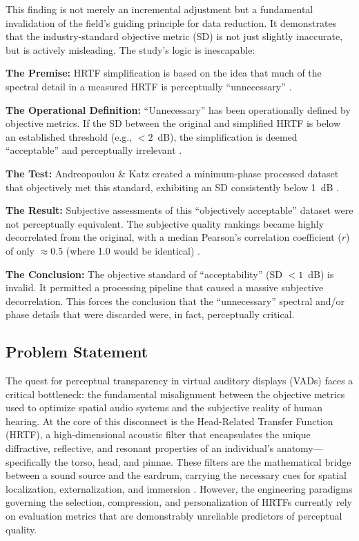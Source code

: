 \documentclass[12pt,a4paper]{article}
\begin{document}
This finding is not merely an incremental adjustment but a fundamental invalidation of the field's guiding principle for data reduction. It demonstrates that the industry-standard objective metric (SD) is not just slightly inaccurate, but is actively misleading. The study's logic is inescapable:

\textbf{The Premise:} HRTF simplification is based on the idea that much of the spectral detail in a measured HRTF is perceptually ``unnecessary'' \cite{andreopoulou2022}.

\textbf{The Operational Definition:} ``Unnecessary'' has been operationally defined by objective metrics. If the SD between the original and simplified HRTF is below an established threshold (e.g., $< 2$~dB), the simplification is deemed ``acceptable'' and perceptually irrelevant \cite{andreopoulou2022}.

\textbf{The Test:} Andreopoulou \& Katz created a minimum-phase processed dataset that objectively met this standard, exhibiting an SD consistently below 1~dB \cite{andreopoulou2022}.

\textbf{The Result:} Subjective assessments of this ``objectively acceptable'' dataset were not perceptually equivalent. The subjective quality rankings became highly decorrelated from the original, with a median Pearson's correlation coefficient ($r$) of only $\approx 0.5$ (where 1.0 would be identical) \cite{andreopoulou2022}.

\textbf{The Conclusion:} The objective standard of ``acceptability'' (SD $< 1$~dB) is invalid. It permitted a processing pipeline that caused a massive subjective decorrelation. This forces the conclusion that the ``unnecessary'' spectral and/or phase details that were discarded were, in fact, perceptually critical.

\subsection{Problem Statement}

The quest for perceptual transparency in virtual auditory displays (VADs) faces a critical bottleneck: the fundamental misalignment between the objective metrics used to optimize spatial audio systems and the subjective reality of human hearing. At the core of this disconnect is the Head-Related Transfer Function (HRTF), a high-dimensional acoustic filter that encapsulates the unique diffractive, reflective, and resonant properties of an individual's anatomy---specifically the torso, head, and pinnae. These filters are the mathematical bridge between a sound source and the eardrum, carrying the necessary cues for spatial localization, externalization, and immersion \cite{asaudio2025}. However, the engineering paradigms governing the selection, compression, and personalization of HRTFs currently rely on evaluation metrics that are demonstrably unreliable predictors of perceptual quality.
\end{document}
